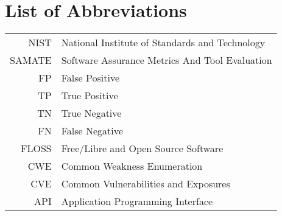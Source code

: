 \chapter*{List of Abbreviations}
\begin{tabular}{rl}
  NIST & National Institute of Standards and Technology \\
  SAMATE & Software Assurance Metrics And Tool Evaluation \\
  FP & False Positive \\
  TP & True Positive \\
  TN & True Negative \\
  FN & False Negative \\
  FLOSS & Free/Libre and Open Source Software \\
  CWE & Common Weakness Enumeration \\
  CVE & Common Vulnerabilities and Exposures \\
  API & Application Programming Interface
\end{tabular}



\listoffigures

\listoftables
